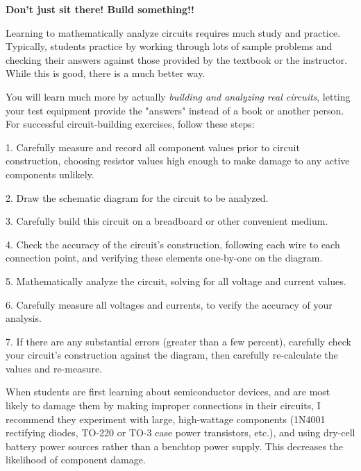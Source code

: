 

\centerline{\bf Don't just sit there!  Build something!!}

\vskip 10pt

Learning to mathematically analyze circuits requires much study and practice.  Typically, students practice by working through lots of sample problems and checking their answers against those provided by the textbook or the instructor.  While this is good, there is a much better way.

You will learn much more by actually {\it building and analyzing real circuits}, letting your test equipment provide the "answers" instead of a book or another person.  For successful circuit-building exercises, follow these steps:

\medskip
\item{1.} Carefully measure and record all component values prior to circuit construction, choosing resistor values high enough to make damage to any active components unlikely.
\item{2.} Draw the schematic diagram for the circuit to be analyzed.
\item{3.} Carefully build this circuit on a breadboard or other convenient medium.
\item{4.} Check the accuracy of the circuit's construction, following each wire to each connection point, and verifying these elements one-by-one on the diagram.
\item{5.} Mathematically analyze the circuit, solving for all voltage and current values.
\item{6.} Carefully measure all voltages and currents, to verify the accuracy of your analysis.
\item{7.} If there are any substantial errors (greater than a few percent), carefully check your circuit's construction against the diagram, then carefully re-calculate the values and re-measure.
\medskip

When students are first learning about semiconductor devices, and are most likely to damage them by making improper connections in their circuits, I recommend they experiment with large, high-wattage components (1N4001 rectifying diodes, TO-220 or TO-3 case power transistors, etc.), and using dry-cell battery power sources rather than a benchtop power supply.  This decreases the likelihood of component damage.

